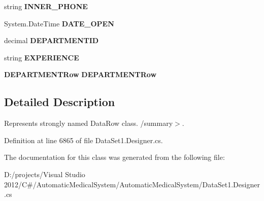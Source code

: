 \begin{CompactItemize}
\item 
string \textbf{INNER\_\-PHONE}\hspace{0.3cm}{\tt  [get, set]}\label{class_automatic_medical_system_1_1_data_set1_1_1_d_o_c_t_o_r_s_row_abad5dab82c284978df215c60d99536a}

\item 
System.DateTime \textbf{DATE\_\-OPEN}\hspace{0.3cm}{\tt  [get, set]}\label{class_automatic_medical_system_1_1_data_set1_1_1_d_o_c_t_o_r_s_row_d6facf5af000aa36ff6d0581bfce982b}

\item 
decimal \textbf{DEPARTMENTID}\hspace{0.3cm}{\tt  [get, set]}\label{class_automatic_medical_system_1_1_data_set1_1_1_d_o_c_t_o_r_s_row_2b7a69dddd2776f98e7779fa6b651f51}

\item 
string \textbf{EXPERIENCE}\hspace{0.3cm}{\tt  [get, set]}\label{class_automatic_medical_system_1_1_data_set1_1_1_d_o_c_t_o_r_s_row_0173506e6c062895686f249a569fa7d9}

\item 
{\bf DEPARTMENTRow} \textbf{DEPARTMENTRow}\hspace{0.3cm}{\tt  [get, set]}\label{class_automatic_medical_system_1_1_data_set1_1_1_d_o_c_t_o_r_s_row_119eaddda2b3f54c10540a6f8b19e9e3}

\end{CompactItemize}


\subsection{Detailed Description}
Represents strongly named DataRow class. /summary$>$. 

Definition at line 6865 of file DataSet1.Designer.cs.

The documentation for this class was generated from the following file:\begin{CompactItemize}
\item 
D:/projects/Visual Studio 2012/C\#/AutomaticMedicalSystem/AutomaticMedicalSystem/DataSet1.Designer.cs\end{CompactItemize}
